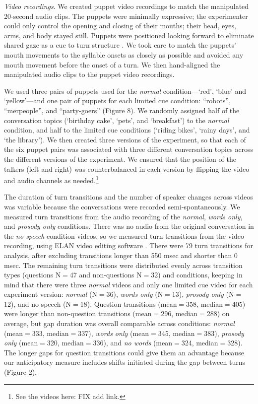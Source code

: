 \documentclass[authoryear, 12pt]{elsarticle}
\begin{document}
\textit{Video recordings}. We created puppet video recordings to match the manipulated 20-second audio clips. The puppets were minimally expressive; the experimenter could only control the opening and closing of their mouths; their head, eyes, arms, and body stayed still. Puppets were positioned looking forward to eliminate shared gaze as a cue to turn structure \citep{thorgrimssonUndRev}. We took care to match the puppets' mouth movements to the syllable onsets as closely as possible and avoided any mouth movement before the onset of a turn. We then hand-aligned the manipulated audio clips to the puppet video recordings.

We used three pairs of puppets used for the \textit{normal} condition---`red', `blue' and `yellow'---and one pair of puppets for each limited cue condition: ``robots'', ``merpeople'', and ``party-goers'' (Figure 8). We randomly assigned half of the conversation topics (`birthday cake', `pets', and `breakfast') to the \textit{normal} condition, and half to the limited cue conditions (`riding bikes', `rainy days', and `the library'). We then created three versions of the experiment, so that each of the six puppet pairs was associated with three different conversation topics across the different versions of the experiment. We ensured that the position of the talkers (left and right) was counterbalanced in each version by flipping the video and audio channels as needed.\footnote{See the videos here: FIX add link.}

The duration of turn transitions and the number of speaker changes across videos was variable because the conversations were recorded semi-spontaneously. We measured turn transitions from the audio recording of the \textit{normal}, \textit{words only}, and \textit{prosody only} conditions. There was no audio from the original conversation in the \textit{no speech} condition videos, so we measured turn transitions from the video recording, using ELAN video editing software \citep{ELAN}. There were 79 turn transitions for analysis, after excluding transitions longer than 550 msec and shorter than 0 msec. The remaining turn transitions were distributed evenly across transition types (questions N$=$47 and non-questions N$=$32) and conditions, keeping in mind that there were three \textit{normal} videos and only one limited cue video for each experiment version: \textit{normal} (N$=$36), \textit{words only} (N$=$13), \textit{prosody only} (N$=$12), and {no speech} (N$=$18). Question transitions (mean$=$358, median$=$405) were longer than non-question transitions (mean$=$296, median$=$288) on average, but gap duration was overall comparable across conditions: \textit{normal} (mean$=$333, median$=$337), \textit{words only} (mean$=$345, median$=$383), \textit{prosody only} (mean$=$320, median$=$336), and \textit{no words} (mean$=$324, median$=$328). The longer gaps for question transitions could give them an advantage because our anticipatory measure includes shifts initiated during the gap between turns (Figure 2).
\end{document}
